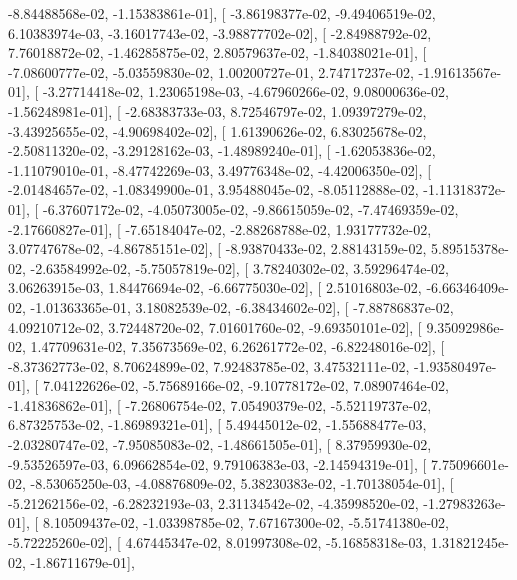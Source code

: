 \documentclass{article}
\begin{document}
         -8.84488568e-02,  -1.15383861e-01],
       [ -3.86198377e-02,  -9.49406519e-02,   6.10383974e-03,
         -3.16017743e-02,  -3.98877702e-02],
       [ -2.84988792e-02,   7.76018872e-02,  -1.46285875e-02,
          2.80579637e-02,  -1.84038021e-01],
       [ -7.08600777e-02,  -5.03559830e-02,   1.00200727e-01,
          2.74717237e-02,  -1.91613567e-01],
       [ -3.27714418e-02,   1.23065198e-03,  -4.67960266e-02,
          9.08000636e-02,  -1.56248981e-01],
       [ -2.68383733e-03,   8.72546797e-02,   1.09397279e-02,
         -3.43925655e-02,  -4.90698402e-02],
       [  1.61390626e-02,   6.83025678e-02,  -2.50811320e-02,
         -3.29128162e-03,  -1.48989240e-01],
       [ -1.62053836e-02,  -1.11079010e-01,  -8.47742269e-03,
          3.49776348e-02,  -4.42006350e-02],
       [ -2.01484657e-02,  -1.08349900e-01,   3.95488045e-02,
         -8.05112888e-02,  -1.11318372e-01],
       [ -6.37607172e-02,  -4.05073005e-02,  -9.86615059e-02,
         -7.47469359e-02,  -2.17660827e-01],
       [ -7.65184047e-02,  -2.88268788e-02,   1.93177732e-02,
          3.07747678e-02,  -4.86785151e-02],
       [ -8.93870433e-02,   2.88143159e-02,   5.89515378e-02,
         -2.63584992e-02,  -5.75057819e-02],
       [  3.78240302e-02,   3.59296474e-02,   3.06263915e-03,
          1.84476694e-02,  -6.66775030e-02],
       [  2.51016803e-02,  -6.66346409e-02,  -1.01363365e-01,
          3.18082539e-02,  -6.38434602e-02],
       [ -7.88786837e-02,   4.09210712e-02,   3.72448720e-02,
          7.01601760e-02,  -9.69350101e-02],
       [  9.35092986e-02,   1.47709631e-02,   7.35673569e-02,
          6.26261772e-02,  -6.82248016e-02],
       [ -8.37362773e-02,   8.70624899e-02,   7.92483785e-02,
          3.47532111e-02,  -1.93580497e-01],
       [  7.04122626e-02,  -5.75689166e-02,  -9.10778172e-02,
          7.08907464e-02,  -1.41836862e-01],
       [ -7.26806754e-02,   7.05490379e-02,  -5.52119737e-02,
          6.87325753e-02,  -1.86989321e-01],
       [  5.49445012e-02,  -1.55688477e-03,  -2.03280747e-02,
         -7.95085083e-02,  -1.48661505e-01],
       [  8.37959930e-02,  -9.53526597e-03,   6.09662854e-02,
          9.79106383e-03,  -2.14594319e-01],
       [  7.75096601e-02,  -8.53065250e-03,  -4.08876809e-02,
          5.38230383e-02,  -1.70138054e-01],
       [ -5.21262156e-02,  -6.28232193e-03,   2.31134542e-02,
         -4.35998520e-02,  -1.27983263e-01],
       [  8.10509437e-02,  -1.03398785e-02,   7.67167300e-02,
         -5.51741380e-02,  -5.72225260e-02],
       [  4.67445347e-02,   8.01997308e-02,  -5.16858318e-03,
          1.31821245e-02,  -1.86711679e-01],
\end{document}
